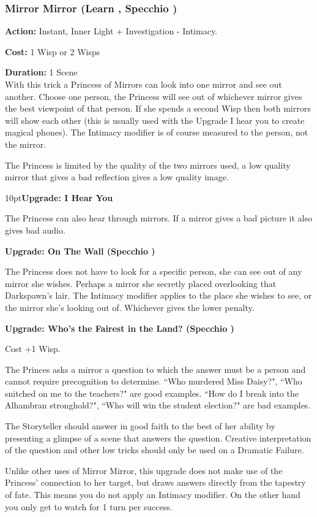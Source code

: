 \subsubsection*{Mirror Mirror (Learn \textbullet\textbullet, Specchio \textbullet\textbullet)}

\noindent \textbf{Action:} Instant, Inner Light + Investigation - Intimacy.

\noindent \textbf{Cost:} 1 Wisp or 2 Wisps

\noindent \textbf{Duration:} 1 Scene\\

\noindent With this trick a Princess of Mirrors can look into one mirror and see out another. Choose one person, the Princess will see out of whichever mirror gives the best viewpoint of that person. If she spends a second Wisp then both mirrors will show each other (this is usually used with the Upgrade I hear you to create magical phones). The Intimacy modifier is of course measured to the person, not the mirror. 

The Princess is limited by the quality of the two mirrors used, a low quality mirror that gives a bad reflection gives a low quality image.

\begin{myindentpar}{10pt}\textbf{Upgrade: I Hear You}

The Princess can also hear through mirrors. If a mirror gives a bad picture it also gives bad audio.

\textbf{Upgrade: On The Wall (Specchio \textbullet\textbullet\textbullet)}

The Princess does not have to look for a specific person, she can see out of any mirror she wishes. Perhaps a mirror she secretly placed overlooking that Darkspawn's lair. The Intimacy modifier applies to the place she wishes to see, or the mirror she's looking out of. Whichever gives the lower penalty.

\textbf{Upgrade: Who's the Fairest in the Land? (Specchio \textbullet\textbullet\textbullet\textbullet\textbullet)}

Cost +1 Wisp.

The Princes asks a mirror a question to which the answer must be a person and cannot require precognition to determine. \textquotedblleft Who murdered Miss Daisy?", \textquotedblleft Who snitched on me to the teachers?" are good examples. \textquotedblleft How do I break into the Alhambran stronghold?", \textquotedblleft Who will win the student election?" are bad examples.

The Storyteller should answer in good faith to the best of her ability by presenting a glimpse of a scene that answers the question. Creative interpretation of the question and other low tricks should only be used on a Dramatic Failure.

Unlike other uses of Mirror Mirror, this upgrade does not make use of the Princess' connection to her target, but draws answers directly from the tapestry of fate. This means you do not apply an Intimacy modifier. On the other hand you only get to watch for 1 turn per success. 

\end{myindentpar}

